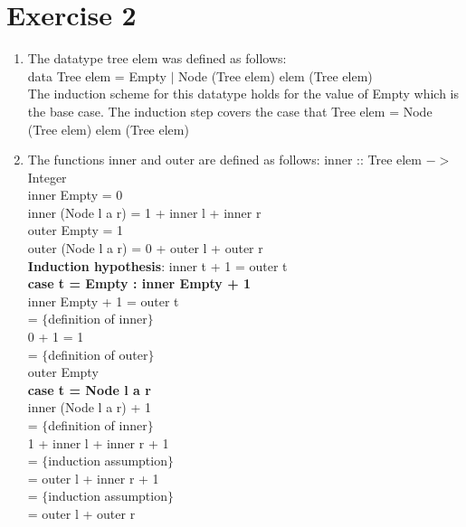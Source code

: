 \documentclass{article}
\begin{document}
\section*{Exercise 2}
\begin{enumerate}
  \item The datatype tree elem was defined as follows: \\
  data Tree elem = Empty $|$ Node (Tree elem) elem (Tree elem) \\
  \newline
  The induction scheme for this datatype holds for the value of Empty which is the base case. The induction step covers the case that Tree elem = Node (Tree elem) elem (Tree elem)
  \item
  \begin{minipage}[t]{1\textwidth}
  The functions inner and outer are defined as follows:
  \newline
  inner :: Tree elem $->$ Integer \\
  inner Empty = 0 \\
  inner (Node l a r) = 1 + inner l + inner r \\
  \newline
  outer Empty = 1 \\
  outer (Node l a r) = 0 + outer l + outer r \\
  \newline
  \textbf{Induction hypothesis}: inner t + 1 = outer t \\
  \textbf{case t = Empty : inner Empty + 1} \\
  inner Empty + 1 = outer t \\
  = $\{$definition of inner$\}$ \\
  0 + 1 = 1 \\
  = $\{$definition of outer$\}$ \\
  outer Empty \\
  \newline
  \textbf{case t = Node l a r }\\
  inner (Node l a r) + 1 \\
  = $\{$definition of inner$\}$ \\
  1 + inner l + inner r + 1 \\
  = $\{$induction assumption$\}$ \\
  = outer l + inner r + 1 \\
  = $\{$induction assumption$\}$ \\
  = outer l + outer r \\
  \newline

\end{minipage}
\end{enumerate}
\end{document}
